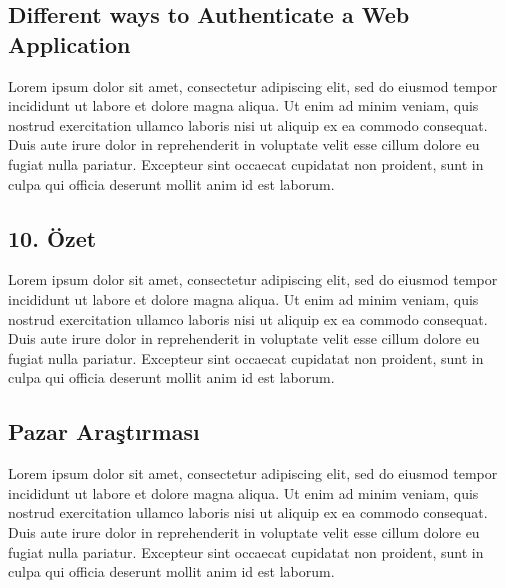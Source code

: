 \subsection{Different ways to Authenticate a Web Application}
Lorem ipsum dolor sit amet, consectetur adipiscing elit, sed do eiusmod tempor incididunt ut labore et dolore magna aliqua. Ut enim ad minim veniam, quis nostrud exercitation ullamco laboris nisi ut aliquip ex ea commodo consequat. Duis aute irure dolor in reprehenderit in voluptate velit esse cillum dolore eu fugiat nulla pariatur. Excepteur sint occaecat cupidatat non proident, sunt in culpa qui officia deserunt mollit anim id est laborum.
\subsection{10. Özet}
Lorem ipsum dolor sit amet, consectetur adipiscing elit, sed do eiusmod tempor incididunt ut labore et dolore magna aliqua. Ut enim ad minim veniam, quis nostrud exercitation ullamco laboris nisi ut aliquip ex ea commodo consequat. Duis aute irure dolor in reprehenderit in voluptate velit esse cillum dolore eu fugiat nulla pariatur. Excepteur sint occaecat cupidatat non proident, sunt in culpa qui officia deserunt mollit anim id est laborum.
\subsection{Pazar Araştırması}
Lorem ipsum dolor sit amet, consectetur adipiscing elit, sed do eiusmod tempor incididunt ut labore et dolore magna aliqua. Ut enim ad minim veniam, quis nostrud exercitation ullamco laboris nisi ut aliquip ex ea commodo consequat. Duis aute irure dolor in reprehenderit in voluptate velit esse cillum dolore eu fugiat nulla pariatur. Excepteur sint occaecat cupidatat non proident, sunt in culpa qui officia deserunt mollit anim id est laborum.




